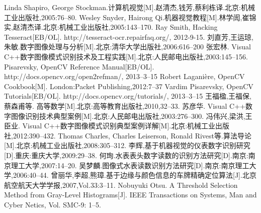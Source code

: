 \begin{thebibliography}{99}
 Linda Shapiro, George Stockman.计算机视觉[M].赵清杰,钱芳,蔡利栋译.北京:机械工业出版社,2005:76--80.
 Wesley Snyder, Hairong Qi.机器视觉教程[M].林学訚,崔锦实,赵清杰译.北京:机械工业出版社,2005:143--170.
 Ray Smith, Hacking Tesseract[EB/OL]. http://tesseract-ocr.repairfaq.org/, 2012-9-15.
 刘直芳,王运琼,朱敏.数字图像处理与分析[M].北京:清华大学出版社,2006:616--200
 张宏林. Visual C++数字图像模式识别技术及工程实践[M].北京:人民邮电出版社,2003:145--156.
 Pisarevsky, OpenCV Reference Manual[EB/OL]. http://docs.opencv.org/open2refman/, 2013--3--15
 Robert Laganière, OpenCV Cookbook[M]. London:Packet Publishing,2012:7--37
 Vardim Pisarevsky, OpenCV Tutorials[EB/OL]. http://docs.opencv.org/tutorials/, 2013--3--15
 王福楹,王福保,蔡森甫等. 高等数学[M].北京:高等教育出版社,2010,32--33.
 苏彦华. Visual C++数字图像识别技术典型案例[M].北京:人民邮电出版社,2003:276--300.
 冯伟兴,梁洪,王臣业. Visual C++数字图像模式识别典型案例详解[M].北京:机械工业出版社,2012:390--432.
 Thomas Charles, Charles Leiserson, Ronald Rivest等.算法导论[M].北京:机械工业出版社,2008:305--312.
 李辉,基于机器视觉的仪表数字识别研究[D].重庆:重庆大学,2009:29--38.
 何珣.水表表头数字读数的识别方法研究[D].南京:南京理工大学,2007:14--20.
 吴梦麟.图像式水表读数识别方法研究[D].南京:南京理工大学,2006:40--44.
 曾丽华,李超,熊璋.基于边缘与颜色信息的车牌精确定位算法[J].北京航空航天大学学报,2007,Vol.33:3--11.
 Nobuyuki Otsu. A Threshold Selection Method from Gray-Level Histograms[J]. IEEE Transactions on Systems, Man and Cyber Netics, Vol. SMC-9: 1--5.
\end{thebibliography}
